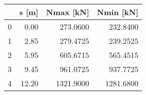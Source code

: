 \begin{tabular}{lrrr}
\toprule
{} &  s [m] &  Nmax [kN] &  Nmin [kN] \\
\midrule
0 &   0.00 &   273.0600 &   232.8400 \\
1 &   2.85 &   279.4725 &   239.2525 \\
2 &   5.95 &   605.6715 &   565.4515 \\
3 &   9.45 &   961.0725 &   937.7725 \\
4 &  12.20 &  1321.9000 &  1281.6800 \\
\bottomrule
\end{tabular}
